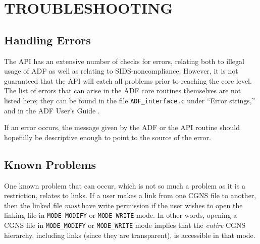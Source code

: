 \documentclass[12pt]{article}
\begin{document}
\newpage
\section{TROUBLESHOOTING} \label{sec:trouble}

\subsection{Handling Errors}

The API has an extensive number of checks for errors, relating
both to illegal usage of ADF as well as relating
to SIDS-noncompliance.
However, it is not guaranteed that
the API will catch all problems prior to reaching the core level.
The list of errors that can arise in the ADF core
routines themselves are not listed here; they
can be found in the file {\tt ADF\_interface.c} under
``Error strings,'' and in the ADF User's Guide \cite{CGNS1}.

If an error occurs, the message given by the ADF or the API
routine should hopefully be descriptive enough to point to the source
of the error.

\subsection{Known Problems}

One known problem that can occur, which is not so much a
problem as it is a restriction, relates to links.  If a user makes
a link from one CGNS file to another, then the linked file
{\it must} have write permission if the user wishes
to open the linking file in {\tt MODE\_MODIFY} or {\tt MODE\_WRITE} mode.
In other words, opening a CGNS file in {\tt MODE\_MODIFY} or {\tt MODE\_WRITE} mode
implies that the {\it entire} CGNS hierarchy, including links (since they are
transparent), is accessible in that mode.  

\end{document}
